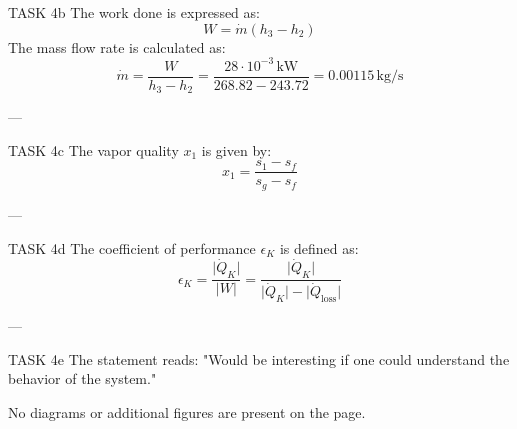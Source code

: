 TASK 4b  
The work done is expressed as:  
\[
W = \dot{m} (h_3 - h_2)
\]  
The mass flow rate is calculated as:  
\[
\dot{m} = \frac{W}{h_3 - h_2} = \frac{28 \cdot 10^{-3} \, \text{kW}}{268.82 - 243.72} = 0.00115 \, \text{kg/s}
\]  

---

TASK 4c  
The vapor quality \( x_1 \) is given by:  
\[
x_1 = \frac{s_1 - s_f}{s_g - s_f}
\]  

---

TASK 4d  
The coefficient of performance \( \epsilon_K \) is defined as:  
\[
\epsilon_K = \frac{\lvert \dot{Q}_K \rvert}{\lvert W \rvert} = \frac{\lvert \dot{Q}_K \rvert}{\lvert \dot{Q}_K \rvert - \lvert \dot{Q}_{\text{loss}} \rvert}
\]  

---

TASK 4e  
The statement reads:  
"Would be interesting if one could understand the behavior of the system."  

No diagrams or additional figures are present on the page.